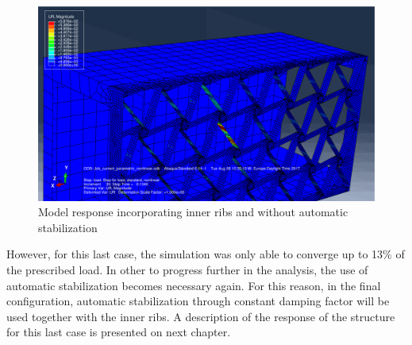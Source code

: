     \begin{figure}[!htpb]
      \centering
      \includegraphics[width=0.8 \textwidth]{../figures/result-model/normalCaseNoDamp2InnerRibs_800N}
      \caption[Model response incorporating inner ribs and without automatic stabilization]{Model response incorporating inner ribs and without automatic stabilization}
      \label{fig:normalCaseNoDamp2InnerRibs}
    \end{figure}

    However, for this last case, the simulation was only able to converge up to 13\% of the prescribed load. In other to progress further in the analysis, the use of automatic stabilization becomes necessary again. For this reason, in the final configuration, automatic stabilization through constant damping factor will be used together with the inner ribs. A description of the response of the structure for this last case is presented on next chapter.